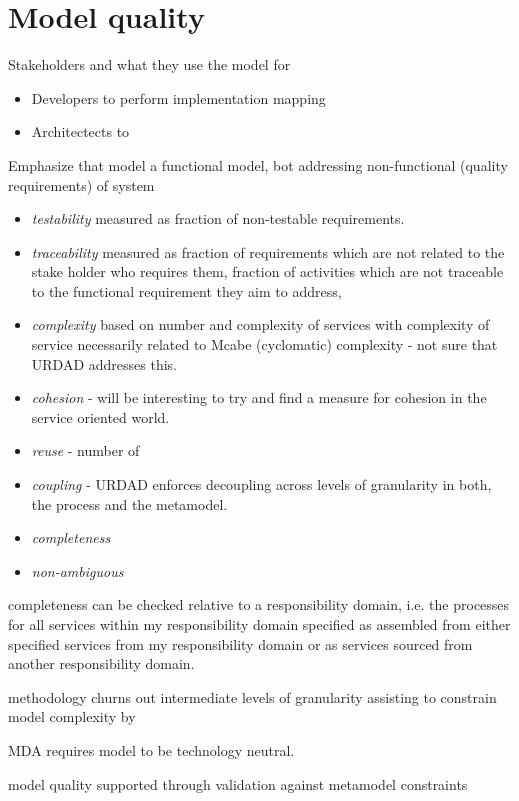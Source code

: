 \section{Model quality}

Stakeholders and what they use the model for
\begin{itemize}
  \item Developers to perform implementation mapping
  \item Architectects to 
\end{itemize}


Emphasize that model a functional model, bot addressing non-functional (quality requirements) of system

\begin{itemize}
  \item \emph{testability} measured as fraction of non-testable requirements.
  \item \emph{traceability} measured as fraction of requirements which are not related to the stake holder who requires them, fraction of activities which are not traceable to the functional requirement they aim to address, 
  \item \emph{complexity} based on number and complexity of services with complexity of service necessarily related to Mcabe (cyclomatic) complexity - not sure that URDAD addresses this.
  \item \emph{cohesion} - will be interesting to try and find a measure for cohesion in the service oriented world.
  \item \emph{reuse} - number of
  \item \emph{coupling} - URDAD enforces decoupling across levels of granularity in both, the process and the metamodel.
  \item \emph{completeness}
  \item \emph{non-ambiguous}
\end{itemize}


completeness can be checked relative to a responsibility domain, i.e. the processes for all services within my responsibility domain specified as assembled from either specified services from my responsibility domain or as services sourced from another responsibility domain.

methodology churns out intermediate levels of granularity assisting to constrain model complexity by 

MDA requires model to be technology neutral.

model quality supported through validation against metamodel constraints


